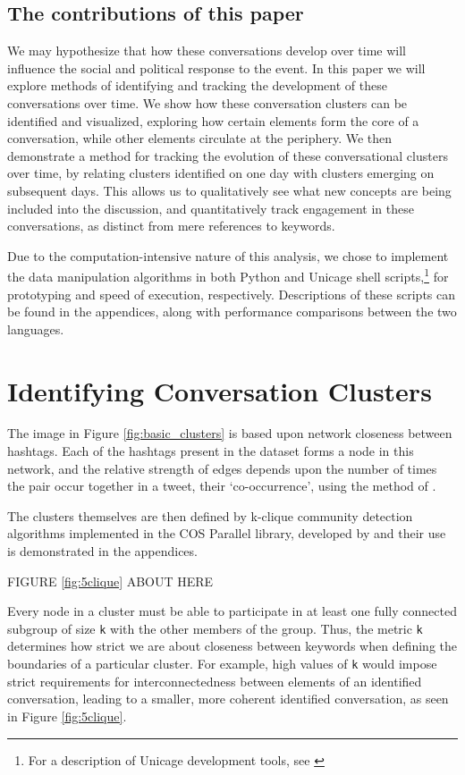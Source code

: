\documentclass[12pt]{article}
\begin{document}
\subsection{The contributions of this paper}
We may hypothesize that how these conversations develop over time will influence the social and political response to the event. 
In this paper we will explore methods of identifying and tracking the development of these conversations over time. We show how these conversation clusters can be identified and visualized, exploring how certain elements form the core of a conversation, while other elements circulate at the periphery. We then demonstrate a method for tracking the evolution of these conversational clusters over time, by relating clusters identified on one day with clusters emerging on subsequent days. This allows us to qualitatively see what new concepts are being included into the discussion, and quantitatively track engagement in these conversations, as distinct from mere references to keywords.

Due to the computation-intensive nature of this analysis, we chose to implement the data manipulation algorithms in both Python and Unicage shell scripts,\footnote{For a description of Unicage development tools, see \cite{Tounaka2013}} for prototyping and speed of execution, respectively. 
Descriptions of these scripts can be found in the appendices, along with performance comparisons between the two languages.

\section{Identifying Conversation Clusters}
The image in Figure \ref{fig:basic_clusters} is based upon network closeness between hashtags. Each of the hashtags present in the dataset forms a node in this network, and the relative strength of edges depends upon the number of times the pair occur together in a tweet, their `co-occurrence', using the method of \cite{Marres}.

The clusters themselves are then defined by k-clique community detection algorithms implemented in the COS Parallel library, developed by \cite{Gregori2013} and their use is demonstrated in the appendices.

\begin{center}
FIGURE \ref{fig:5clique} ABOUT HERE
\end{center}

Every node in a cluster must be able to participate in at least one fully connected subgroup of size \texttt{k} with the other members of the group. Thus, the metric \texttt{k} determines how strict we are about closeness between keywords when defining the boundaries of a particular cluster. 
For example, high values of \texttt{k} would impose strict requirements for interconnectedness between elements of an identified conversation, leading to a smaller, more coherent identified conversation, as seen in Figure \ref{fig:5clique}.
\end{document}
